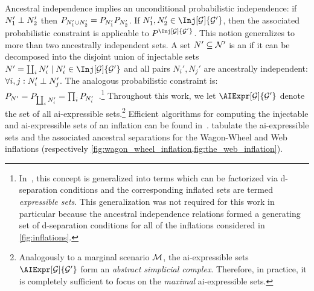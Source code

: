 \documentclass[aps, 10pt, english, twoside, pra, nofootinbib, tightenlines, longbibliography, superscriptaddress]{revtex4-1}
\begin{document}
    Ancestral independence implies an unconditional probabilistic independence: if $N_1' \perp N_2'$ then $\prob[N_1' \cup N_2'] = \prob[N_1']\prob[N_2']$. If $N_1', N_2' \in \Inj[\graph]{\graph'}$, then the associated probabilistic constraint is applicable to $\prob^{\Inj[\graph]{\graph'}}$. This notion generalizes to more than two ancestrally independent sets. A set $N' \subseteq \mathcal{N}'$ is an  if it can be decomposed into the disjoint union of injectable sets $N' = \coprod_{i} N'_i \mid N'_i \in \Inj[\graph]{\graph'}$ and all pairs $N_i', N_j'$ are ancestrally independent: $\forall i, j : N_i' \perp N_j'$. The analogous probabilistic constraint is: $\prob[N'] = \prob[\coprod_i N'_i] = \prod_{i}\prob[N'_i]$~\cite{Pearl_2009}.\footnote{In~\cite{Inflation}, this concept is generalized into terms which can be factorized via d-separation conditions and the corresponding inflated sets are termed \textit{expressible sets}. This generalization was not required for this work in particular because the ancestral independence relations formed a generating set of d-separation conditions for all of the inflations considered in \cref{fig:inflations}.} Throughout this work, we let $\AIExpr[\graph]{\graph'}$ denote the set of all ai-expressible sets.\footnote{Analogously to a marginal scenario $\mathcal{M}$, the ai-expressible sets $\AIExpr[\graph]{\graph'}$ form an \textit{abstract simplicial complex}. Therefore, in practice, it is completely sufficient to focus on the \textit{maximal} ai-expressible sets.} Efficient algorithms for computing the injectable and ai-expressible sets of an inflation can be found in~\cite{Inflation}.  tabulate the ai-expressible sets and the associated ancestral separations for the Wagon-Wheel and Web inflations (respectively \cref{fig:wagon_wheel_inflation,fig:the_web_inflation}).
\end{document}
